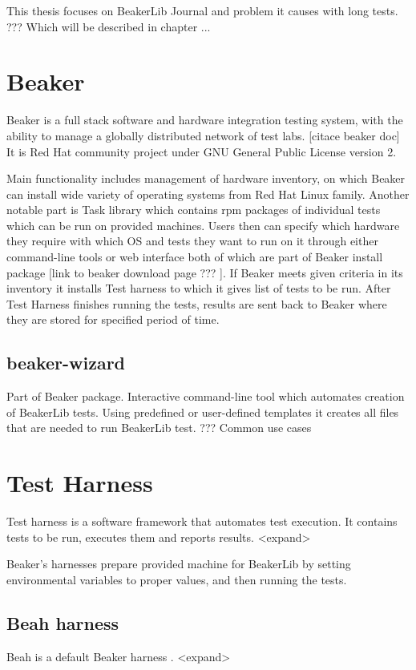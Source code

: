 This thesis focuses on BeakerLib Journal and problem it causes with long tests. ??? Which will be described in chapter ...


\section{Beaker}

Beaker is a full stack software and hardware integration testing system, with the ability to manage a globally distributed network of test labs.  [citace beaker doc] It is Red Hat community project under GNU General Public License version 2.

Main functionality includes management of hardware inventory, on which Beaker can install wide variety  of operating systems from Red Hat Linux family. Another notable part  is Task library which contains rpm packages of individual tests which can be run on provided machines. 
Users then can specify which hardware they require with which OS and tests they want to run on it through either command-line tools or web interface both of which are part of Beaker install package [link to beaker download page ??? ]. If Beaker meets given criteria in its inventory it installs Test harness to which it gives list of tests to be run.  After Test Harness finishes running the tests, results are sent back to Beaker where they are stored for specified period of time. 

\subsection{beaker-wizard}
Part of Beaker package. Interactive command-line tool which automates creation of BeakerLib tests. Using predefined or user-defined templates it creates all files that are needed to run BeakerLib test. 
???  Common use cases

\section{Test Harness}
Test harness is a software framework that automates test execution. It contains tests to be run, executes them and reports results. <expand>

Beaker’s harnesses prepare provided machine for BeakerLib by setting environmental variables to proper values, and then running the tests.

\subsection{Beah harness}
Beah \cite{beah_doc} is a default Beaker harness . <expand> 

